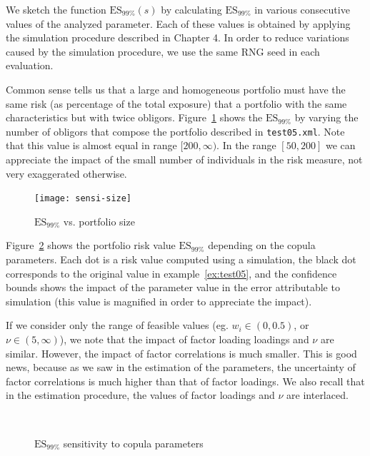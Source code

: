 \documentclass[11pt,fleqn]{book} %
\begin{document}
We sketch the function $\text{ES}_{99\%}(s)$ by calculating $\text{ES}_{99\%}$ 
in various consecutive values of the analyzed parameter. Each of these values 
is obtained by applying the simulation procedure described in Chapter 4. 
In order to reduce variations caused by the simulation procedure, we use the 
same RNG seed in each evaluation.

\begin{example}
	Common sense tells us that a large and homogeneous portfolio must have the 
	same risk (as percentage of the total exposure) that a portfolio with the 
	same characteristics but with twice obligors. Figure~\ref{fig:sensi1}
	shows the $\text{ES}_{99\%}$ by varying the number of obligors that 
	compose the portfolio described in \texttt{test05.xml}. Note that this
	value is almost equal in range $[200,\infty)$. In the range $[50,200]$
	we can appreciate the impact of the small number of individuals in the 
	risk measure, not very exaggerated otherwise.
\end{example}

\begin{figure}[!ht]
	\centering
	\texttt{[image: sensi-size]}
	\caption{$\text{ES}_{99\%}$ vs. portfolio size}
	\label{fig:sensi1}
\end{figure}

\begin{example}
	Figure~\ref{fig:sensi2} shows the portfolio risk value $\text{ES}_{99\%}$ 
	depending on the copula parameters. Each dot is a 
	risk value computed using a simulation, the black dot corresponds to the 
	original value in example~\ref{ex:test05}, and the confidence bounds shows 
	the impact of the parameter value in the error attributable to simulation 
	(this value is magnified in order to appreciate the impact).
	
	If we consider only the range of feasible values (eg. $w_i \in (0,0.5)$, or
	$\nu \in (5,\infty)$), we note that the impact of factor loading loadings
	and $\nu$ are similar. However, the impact of factor correlations is much 
	smaller. This is good news, because as we saw in the estimation of the 
	parameters, the uncertainty of factor correlations is much higher than 
	that of factor loadings. We also recall that in the estimation procedure,
	the values of factor loadings and $\nu$ are interlaced. 
\end{example}

\begin{figure}[!h]
	\centering
	\\
	\caption{$\text{ES}_{99\%}$ sensitivity to copula parameters}
	\label{fig:sensi2}
\end{figure}
\end{document}
